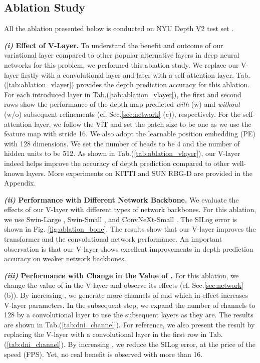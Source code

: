 \documentclass{article} \usepackage{iclr2023_conference, times}
\newcommand{\formattedparagraph}[1]{\noindent \textbf{#1}}
\begin{document}
\subsection{Ablation Study} \label{sec:exp_aba}
All the ablation presented below is conducted on NYU Depth V2 test set \citep{silberman2012indoor}. 


\formattedparagraph{\textit{(i)} Effect of V-Layer.} To understand the benefit and outcome of our variational layer compared to other popular alternative layers in deep neural networks for this problem, we performed this ablation study. We replace our V-layer firstly with a convolutional layer and later with a self-attention layer. Tab.(\ref{tab:ablation_vlayer}) provides the depth prediction accuracy for this ablation. For each introduced layer in Tab.(\ref{tab:ablation_vlayer}), the first and second rows show the performance of the depth map predicted {\em with} (w) and {\em without} (w/o) subsequent refinements (cf. Sec.\ref{sec:network} (c)), respectively. For the self-attention layer, we follow the ViT \citep{dosovitskiy2020image} and set the patch size to be one as we use the feature map with stride 16. We also adopt the learnable position embedding (PE) with 128 dimensions. We set the number of heads to be 4 and the number of hidden units to be 512. As shown in Tab.(\ref{tab:ablation_vlayer}), our V-layer indeed helps improve the accuracy of depth prediction compared to other well-known layers. More experiments on KITTI and SUN RBG-D are provided in the Appendix.



\formattedparagraph{\textit{(ii)} Performance with Different Network Backbone.} We evaluate the effects of our V-layer with different types of network backbones. For this ablation, we use Swin-Large \citep{liu2021swin}, Swin-Small \citep{liu2021swin}, and ConvNeXt-Small \citep{liu2022convnet}. The SILog error is shown in Fig. \ref{fig:ablation_bone}. The results show that our V-layer improves the transformer and the convolutional network performance. An important observation is that our V-layer shows excellent improvements in depth prediction accuracy on weaker network backbones.





\formattedparagraph{\textit{(iii)} Performance with Change in the Value of .} For this ablation, we change the value of  in the V-layer and observe its effects (cf. Sec.\ref{sec:network} (b)). By increasing , we generate more channels of  and  which in-effect increases V-layer parameters. In the subsequent step, we expand the number of channels to 128 by a convolutional layer to use the  subsequent layers as they are. The results are shown in Tab.(\ref{tab:dni_channel}). For reference, we also present the result by replacing the V-layer with a convolutional layer in the first row in Tab.(\ref{tab:dni_channel}). By increasing , we reduce the SILog error, at the price of the speed (FPS). Yet, no real benefit is observed with  more than 16. 
\end{document}

